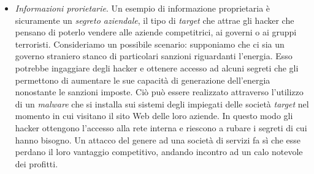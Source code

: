 \begin{itemize}
\begin{itemize}
	\end{itemize}
\item \textit{Informazioni prorietarie}. Un esempio di informazione proprietaria è sicuramente un \textit{segreto aziendale}, il tipo di \textit{target} che attrae gli hacker che pensano di poterlo vendere alle aziende competitrici, ai governi o ai gruppi terroristi. \newline Consideriamo un possibile scenario: supponiamo che ci sia un governo straniero stanco di particolari sanzioni riguardanti l'energia. Esso potrebbe ingaggiare degli hacker e ottenere accesso ad alcuni segreti che gli permettono  di aumentare le sue capacità di generazione dell'energia nonostante le sanzioni imposte. Ciò può essere realizzato attraverso l'utilizzo di un \textit{malware} che si installa sui sistemi degli impiegati delle società \textit{target} nel momento in cui visitano il sito Web delle loro aziende. In questo modo gli hacker ottengono l'accesso alla rete interna e riescono a rubare i segreti di cui hanno bisogno. Un attacco del genere ad una società di servizi fa sì che esse perdano il loro vantaggio competitivo, andando incontro ad un calo notevole dei profitti.
\end{itemize}

